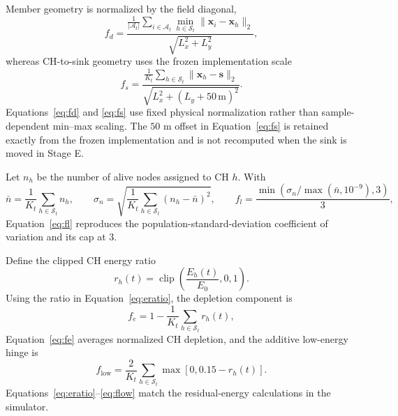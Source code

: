 \documentclass[pdflatex,sn-mathphys-num]{sn-jnl}
\begin{document}
Member geometry is normalized by the field diagonal,
\begin{equation}
f_d=
\frac{\frac{1}{|\mathcal{A}_t|}\sum_{i\in\mathcal{A}_t}\min_{h\in\mathcal{S}_t}\|\mathbf{x}_i-\mathbf{x}_h\|_2}
{\sqrt{L_x^2+L_y^2}},
\label{eq:fd}
\end{equation}
whereas CH-to-sink geometry uses the frozen implementation scale
\begin{equation}
f_s=
\frac{\frac{1}{K_t}\sum_{h\in\mathcal{S}_t}\|\mathbf{x}_h-\mathbf{s}\|_2}
{\sqrt{L_x^2+(L_y+50\,\mathrm{m})^2}}.
\label{eq:fs}
\end{equation}
Equations~\eqref{eq:fd} and \eqref{eq:fs} use fixed physical normalization rather than sample-dependent min--max scaling. The $50$ m offset in Equation~\eqref{eq:fs} is retained exactly from the frozen implementation and is not recomputed when the sink is moved in Stage E.

Let $n_h$ be the number of alive nodes assigned to CH $h$. With
\begin{equation}
\bar n=\frac{1}{K_t}\sum_{h\in\mathcal{S}_t}n_h,\qquad
\sigma_n=\sqrt{\frac{1}{K_t}\sum_{h\in\mathcal{S}_t}(n_h-\bar n)^2},\qquad
f_l=\frac{\min\!\left(\sigma_n/\max(\bar n,10^{-9}),3\right)}{3},
\label{eq:fl}
\end{equation}
Equation~\eqref{eq:fl} reproduces the population-standard-deviation coefficient of variation and its cap at 3.

Define the clipped CH energy ratio
\begin{equation}
r_h(t)=\operatorname{clip}\!\left(\frac{E_h(t)}{E_0},0,1\right).
\label{eq:eratio}
\end{equation}
Using the ratio in Equation~\eqref{eq:eratio}, the depletion component is
\begin{equation}
f_e=1-\frac{1}{K_t}\sum_{h\in\mathcal{S}_t}r_h(t),
\label{eq:fe}
\end{equation}
Equation~\eqref{eq:fe} averages normalized CH depletion, and the additive low-energy hinge is
\begin{equation}
f_{\mathrm{low}}=\frac{2}{K_t}\sum_{h\in\mathcal{S}_t}\max[0,0.15-r_h(t)].
\label{eq:flow}
\end{equation}
Equations~\eqref{eq:eratio}--\eqref{eq:flow} match the residual-energy calculations in the simulator.
\end{document}
